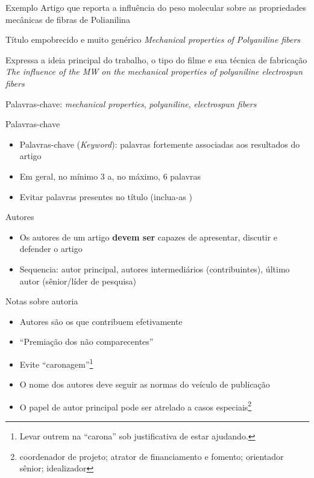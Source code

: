 \begin{frame}{Exemplo}
Artigo que reporta a influência do peso molecular sobre as propriedades mecânicas de fibras de Polianilina

\begin{block}{Título empobrecido e muito genérico}
\emph{Mechanical properties of Polyaniline fibers}
\end{block}
\end{frame}

\begin{frame}
\begin{block}{Expressa a ideia principal do trabalho, o tipo do filme e sua técnica de fabricação}
\emph{The influence of the MW on the mechanical properties of polyaniline electrospun fibers}

Palavras-chave: \emph{mechanical properties}, \emph{polyaniline}, \emph{electrospun fibers}
\end{block}
\end{frame}

\begin{frame}{Palavras-chave}
\begin{itemize}
\item Palavras-chave (\emph{Keyword}): palavras fortemente associadas aos resultados do artigo
\item Em geral, no mínimo 3 a, no máximo, 6 palavras 
\item Evitar palavras presentes no título (inclua-as ) 
\end{itemize}
\end{frame}

\begin{frame}{Autores}
\begin{itemize}
\item Os autores de um artigo \textbf{devem ser} capazes de apresentar, discutir e defender o artigo
\item Sequencia: autor principal, autores intermediários (contribuintes), último autor (sênior/líder de pesquisa)
\end{itemize}
\end{frame}

\begin{frame}{Notas sobre autoria}
\begin{itemize}
\item Autores são os que contribuem efetivamente
\item ``Premiação dos não comparecentes''
\item Evite ``caronagem''\footnote{Levar outrem na ``carona'' sob justificativa de estar ajudando.}
\item O nome dos autores deve seguir as normas do veículo de publicação
\item O papel de autor principal pode ser atrelado a casos especiais\footnote{coordenador de projeto; atrator de financiamento e fomento; orientador sênior; idealizador}
\end{itemize}
\end{frame}

